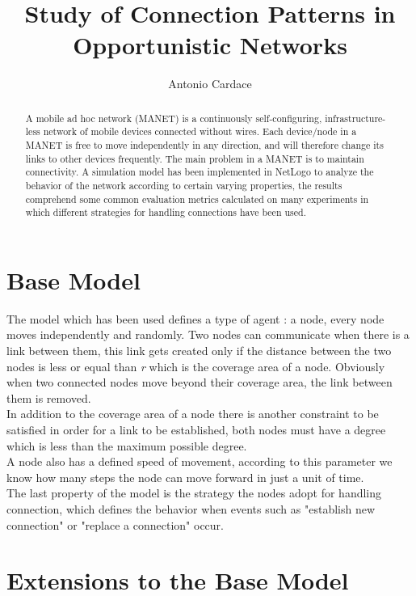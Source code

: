 \documentclass{llncs}
\begin{document}
\mainmatter              %
%
\title{Study of Connection Patterns in Opportunistic Networks}
%
\author{Antonio Cardace}
%
\maketitle
%
\begin{abstract}
A mobile ad hoc network (MANET) is a continuously self-configuring, infrastructure-less network of mobile devices connected without wires. Each   device/node in a MANET is free to move independently in any direction, and   will therefore change its links to other devices frequently. The main problem in a MANET is to maintain connectivity. A simulation model has been implemented in NetLogo to analyze the behavior of the network according to certain varying properties, the results comprehend some common evaluation metrics calculated on many experiments in which different strategies for handling connections have been used.
\end{abstract}

\section{Base Model}
The model which has been used defines a type of agent : a node, every node moves independently and randomly. Two nodes can communicate when there is a link between them, this link gets created only if the distance between the two nodes is less or equal than \textit{r} which is the coverage area of a node. Obviously when two connected nodes move beyond their coverage area, the link between them is removed.\\
In addition to the coverage area of a node there is another constraint to be satisfied in order for a link to be established, both nodes must have a degree which is less than the maximum possible degree.\\
A node also has a defined speed of movement, according to this parameter we know how many steps the node can move forward in just a unit of time.\\
The last property of the model is the strategy the nodes adopt for handling connection, which defines the behavior when events such as "establish new connection" or "replace a connection" occur.

\section{Extensions to the Base Model}
\end{document}
